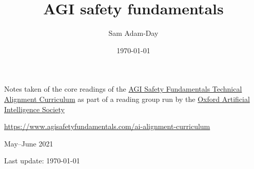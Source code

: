 \documentclass[a4paper]{report}
\title{AGI safety fundamentals}
\author{Sam Adam-Day}
\date{\today}
\begin{document}
	\makeatletter
	\begin{titlepage}
		\begin{center}

			\vspace*{1cm}
			
			\Huge
			\textbf{\@title}

			\vspace*{1cm}

			\LARGE
			Notes taken of the core readings of the \href{https://www.agisafetyfundamentals.com/ai-alignment-curriculum}{AGI Safety Fundamentals Technical Alignment Curriculum} as part of a reading group run by the \href{https://oxai.org/}{Oxford Artificial Intelligence Society}

			\vspace*{0.5cm}

			\url{https://www.agisafetyfundamentals.com/ai-alignment-curriculum}

			\vfill

			\Large
			\@author

			\vspace*{0.5cm}

			\Large
			May--June 2021

			\vspace*{0.5cm}

			Last update: \today

		\end{center}
	\end{titlepage}
	\makeatother

	\setcounter{tocdepth}{1}
	\tableofcontents

    
	
	
	
	
	
	

	\printbibliography
\end{document}
